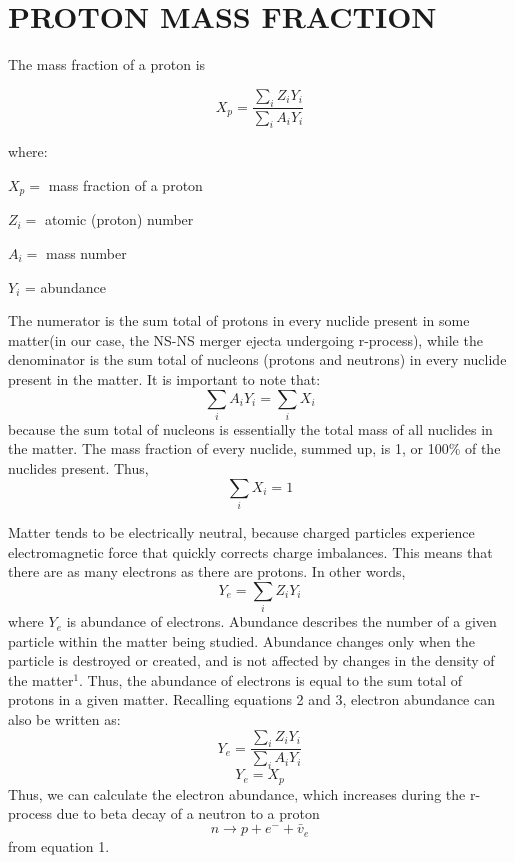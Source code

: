 \documentclass[11pt, letterpaper]{article}
\begin{document}
\section{PROTON MASS FRACTION}

The mass fraction of a proton is

\begin{equation} 
X_p = \frac{\sum_{i}Z_iY_i}{\sum_{i}A_iY_i} 
\end{equation}

where:
\begin{multicols}{2}
\begin{center}

$X_p =$ mass fraction of a proton

$Z_i =$ atomic (proton) number

\columnbreak

$A_i =$ mass number

$Y_i$ = abundance

\end{center}
\end{multicols}

\indent The numerator is the sum total of protons in every nuclide present in some matter(in our case, the NS-NS merger ejecta undergoing r-process), while the denominator is the sum total of nucleons (protons and neutrons) in every nuclide present in the matter. It is important to note that: 
\begin{equation} 
\sum_{i}A_iY_i = \sum_{i}X_i
\end{equation}
because the sum total of nucleons is essentially the total mass of all nuclides in the matter. The mass fraction of every nuclide, summed up, is 1, or 100\% of the nuclides present. Thus, 
\begin{equation} 
\sum_{i}X_i = 1
\end{equation}

\indent Matter tends to be electrically neutral, because charged particles experience electromagnetic force that quickly corrects charge imbalances. This means that there are as many electrons as there are protons. In other words, 
\begin{equation} 
Y_e = \sum_{i}Z_iY_i
\end{equation}
where $Y_e$ is abundance of electrons. Abundance describes the number of a given particle within the matter being studied. Abundance changes only when the particle is destroyed or created, and is not affected by changes in the density of the matter$^{1}$. Thus, the abundance of electrons is equal to the sum total of protons in a given matter. Recalling equations 2 and 3, electron abundance can also be written as: 
\begin{equation} 
Y_e = \frac{\sum_{i}Z_iY_i}{\sum_{i}A_iY_i}
\end{equation}
\begin{equation} 
Y_e = X_p
\end{equation}
Thus, we can calculate the electron abundance, which increases during the r-process due to beta decay of a neutron to a proton \[n \rightarrow p + e^- + \bar v_e\] from equation 1.
\end{document}
